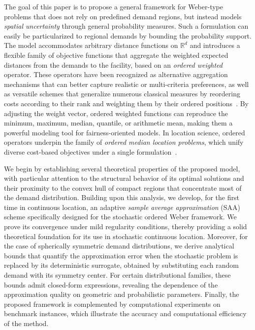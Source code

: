 \documentclass[letter,11pt, reqno]{amsart}
\renewcommand{\;}{\quad}
\theoremstyle{thmstyleone}%
\theoremstyle{thmstyletwo}%
\theoremstyle{thmstylethree}%
\begin{document}
The goal of this paper is to propose a general framework for Weber-type problems that does not rely on predefined demand regions, but instead models \emph{spatial uncertainty} through general probability measures. Such a formulation can easily be particularized to regional demands by bounding the probability support. The model accommodates arbitrary distance functions on $\mathbb{R}^d$ and introduces a flexible family of objective functions that aggregate the weighted expected distances from the demands to the facility, based on an \emph{ordered weighted} operator. These operators have been recognized as alternative aggregation mechanisms that can better capture realistic or multi-criteria preferences, as well as versatile schemes that generalize numerous classical measures by reordering costs according to their rank and weighting them by their ordered positions~\citep{Yager1988}. By adjusting the weight vector, ordered weighted functions can reproduce the minimum, maximum, median, quantile, or arithmetic mean, making them a powerful modeling tool for fairness-oriented models. In location science, ordered operators underpin the family of \emph{ordered median location problems}, which unify diverse cost-based objectives under a single formulation~\citep[see, e.g.,][]{g:puerto2000geometrical,nickel2005location,blanco2014revisiting,blanco2016continuous,Labbe2017,Marin2020,blanco2023fairness,Ljubic2024,espejo2009convex}.

We begin by establishing several theoretical properties of the proposed model, with particular attention to the structural behavior of its optimal solutions and their proximity to the convex hull of compact regions that concentrate most of the demand distribution. Building upon this analysis, we develop, for the first time in continuous location, an adaptive \emph{sample average approximation} (SAA) scheme specifically designed for the stochastic ordered Weber framework. We prove its convergence under mild regularity conditions, thereby providing a solid theoretical foundation for its use in stochastic continuous location. Moreover, for the case of spherically symmetric demand distributions, we derive analytical bounds that quantify the approximation error when the stochastic problem is replaced by its deterministic surrogate, obtained by substituting each random demand with its symmetry center. For certain distributional families, these bounds admit closed-form expressions, revealing the dependence of the approximation quality on geometric and probabilistic parameters. Finally, the proposed framework is complemented by computational experiments on benchmark instances, which illustrate the accuracy and computational efficiency of the method.
\end{document}
